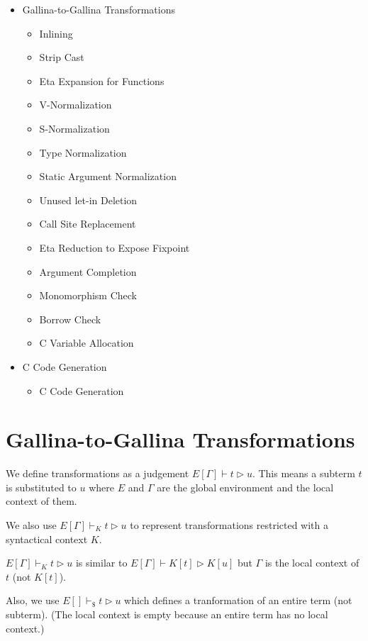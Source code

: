 \documentclass[a4paper,fleqn]{article}
\def\gallina{\textrm{Gallina}}
\newcommand{\reltri}{\mathrel{\triangleright}}
\begin{document}
\begin{itemize}
\item \gallina-to-\gallina{} Transformations
  \begin{itemize}
  \item Inlining
  \item Strip Cast
  \item Eta Expansion for Functions
  \item V-Normalization
  \item S-Normalization
  \item Type Normalization
  \item Static Argument Normalization
  \item Unused let-in Deletion
  \item Call Site Replacement
  \item Eta Reduction to Expose Fixpoint
  \item Argument Completion
  \item Monomorphism Check
  \item Borrow Check
  \item C Variable Allocation
  \end{itemize}
\item C Code Generation
  \begin{itemize}
  \item C Code Generation
  \end{itemize}
\end{itemize}

\section{\gallina-to-\gallina{} Transformations}\label{sec:gallina-to-gallina-transformations}

We define transformations as a judgement $E[\Gamma] \vdash t \reltri u$.
This means a subterm $t$ is substituted to $u$ where
$E$ and $\Gamma$ are the global environment and the local context of them.

We also use $E[\Gamma] \vdash_K t \reltri u$ to represent transformations restricted with a syntactical context $K$.

$E[\Gamma] \vdash_K t \reltri u$ is similar to $E[\Gamma] \vdash K[t] \reltri K[u]$ but
$\Gamma$ is the local context of $t$ (not $K[t]$).

Also, we use $E[] \vdash_\$ t \reltri u$ which defines a tranformation of an entire term (not subterm).
(The local context is empty because an entire term has no local context.)
\end{document}
